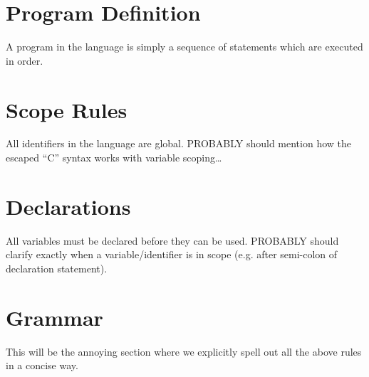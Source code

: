 \section{Program Definition}
A program in the \sys{} language is simply a sequence of statements which
are executed in order.

\section{Scope Rules}
All identifiers in the \sys{} language are global.
PROBABLY should mention how the escaped ``C'' syntax works with variable scoping\ldots

\section{Declarations}
All variables must be declared before they can be used.
PROBABLY should clarify exactly when a variable/identifier is in scope (e.g. after semi-colon of declaration statement).

\section{Grammar}
This will be the annoying section where we explicitly spell out all the above rules
in a concise way.
